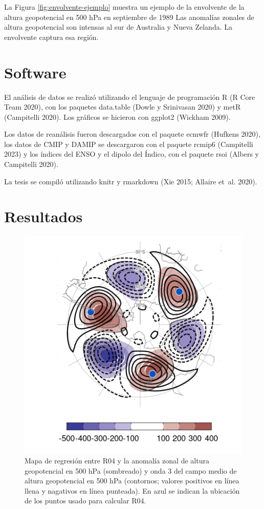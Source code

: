 \documentclass[12pt,oneside,a4paper]{reedthesis}
\begin{document}
La Figura \ref{fig:envolvente-ejemplo} muestra un ejemplo de la envolvente de la altura geopotencial en 500 hPa en septiembre de 1989
Las anomalías zonales de altura geopotencial son intensas al sur de Australia y Nueva Zelanda.
La envolvente captura esa región.

\hypertarget{software-1}{%
\section{Software}\label{software-1}}

El análisis de datos se realizó utilizando el lenguaje de programación R (R Core Team 2020), con los paquetes data.table (Dowle y Srinivasan 2020) y metR (Campitelli 2020).
Los gráficos se hicieron con ggplot2 (Wickham 2009).

Los datos de reanálisis fueron descargados con el paquete ecmwfr (Hufkens 2020), los datos de CMIP y DAMIP se descargaron con el paquete rcmip6 (Campitelli 2023) y los índices del ENSO y el dipolo del Índico, con el paquete rsoi (Albers y Campitelli 2020).

La tesis se compiló utilizando knitr y rmarkdown (Xie 2015; Allaire et~al. 2020).

\hypertarget{resultados}{%
\section{Resultados}\label{resultados}}

\begin{figure}

{\centering \includegraphics{figures/15-onda3/raphael-regr-1} 

}

\caption{Mapa de regresión entre R04 y la anomalía zonal de altura geopotencial en 500 hPa (sombreado) y onda 3 del campo medio de altura geopotencial en 500 hPa (contornos; valores positivos en línea llena y nagativos en línea punteada). En azul se indican la ubicación de los puntos usado para calcular R04.}\label{fig:raphael-regr}
\end{figure}
\end{document}
